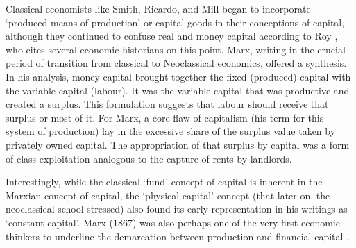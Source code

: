 Classical economists like Smith, Ricardo, and Mill %
began to incorporate ‘produced means of production’ or capital goods in their conceptions of capital, although they continued to  confuse real and money capital according to Roy \cite{royEvolutionConceptCapital2009}, who cites several  economic historians on this point. Marx, writing  in the crucial period of transition from classical to Neoclassical economics, offered a  synthesis. In his analysis, money capital brought together the fixed (produced) capital   with the variable capital  (labour). It was the variable capital that was productive and created a surplus. This formulation suggests that labour should receive that surplus or most of it. For Marx, a core flaw of capitalism (his term for this system of production) lay in the excessive share of the surplus value taken by privately owned capital. The appropriation of that surplus by capital was a form of class exploitation analogous to the capture of rents by landlords.  

 Interestingly, while the classical ‘fund’ concept of capital is inherent in the Marxian concept of capital, the ‘physical capital’ concept (that later on, the neoclassical school stressed) also found its early representation in his writings as ‘constant capital’. Marx (1867) was also perhaps one of the very first economic thinkers to underline the demarcation between production and financial capital \cite{royEvolutionConceptCapital2009}. 




